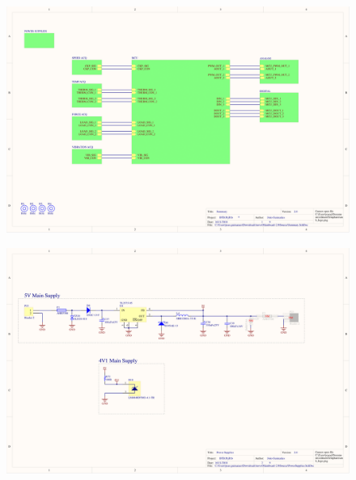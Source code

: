 \begin{figure}[htbp]
	\centering
	\includegraphics[width=1\textwidth, angle=270]{figuras/fig-schematic-1}
\end{figure}

\begin{figure}[htbp]
	\centering
	\includegraphics[width=1\textwidth, angle=270]{figuras/fig-schematic-2}
\end{figure}

